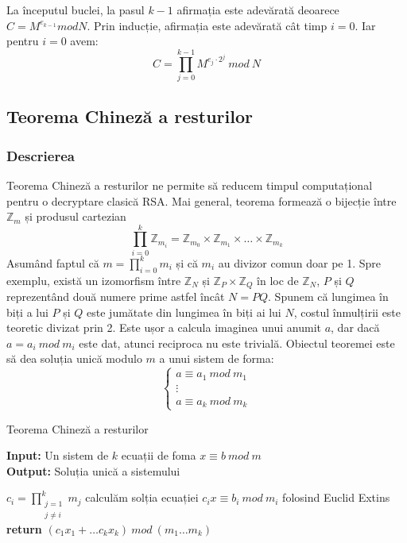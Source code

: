 \documentclass[12]{report}
\begin{document}
      
      La începutul buclei, la pasul $ k-1 $ afirmația este adevărată deoarece $ C = M^{e_{k-1}} mod N$. Prin inducție, afirmația este adevărată cât timp $ i=0$. Iar pentru $i=0$ avem: \\
      $$ C= \prod_{j=0}^{k-1} M^{e_j \cdot   2^j}  \ mod \ N $$
      
     \subsection{Teorema Chineză a resturilor}
      \subsubsection{Descrierea}
      Teorema Chineză a resturilor ne permite să reducem timpul computațional pentru o decryptare clasică RSA. Mai general, teorema formează o bijecție între $ \mathbb{Z}_m $ și produsul cartezian \\
      $$ \prod_{i=0}^{k} \mathbb{Z}_{m_i} = \mathbb{Z}_{m_0} \times \mathbb{Z}_{m_1} \times \dots \times  \mathbb{Z}_{m_k}$$
      Asumând faptul că $ m = \prod_{i=0}^{k} m_i $ și că $ m_i $ au divizor comun doar pe 1. Spre exemplu, există un izomorfism între $ \mathbb{Z}_N$ și $\mathbb{Z}_P \times \mathbb{Z}_Q  $ în loc de $ \mathbb{Z}_N $, $ P $ și $Q$ reprezentând două numere prime astfel încât $ N=PQ$. Spunem că lungimea în biți a lui $P$ și $Q$ este jumătate din lungimea în biți ai lui $N$, costul înmulțirii este teoretic divizat prin 2. Este ușor a calcula imaginea unui anumit $a$, dar dacă $ a= a_i \ mod \ m_i $ este dat, atunci reciproca nu este trivială. Obiectul teoremei este să dea soluția unică modulo $m$ a unui sistem de forma: \\
    \[
\left\{ 
\begin{array}{c}
a \equiv a_1 \ mod \ m_1 \\ 
 \vdots  \\ 
a \equiv a_k \ mod \ m_k
\end{array}
\right. 
\]

		  \begin{algorithm}[H]
		   \caption{Teorema Chineză a resturilor}
		   \textbf{Input:} Un sistem de $k$ ecuații de foma $x \equiv b \ mod \ m$ \\
		   \textbf{Output:} Soluția unică a sistemului
		   \begin{algorithmic}
		   	\State $c_i = \prod_{\substack{j=1 \\ j \neq i }}^{k} m_j$
		   	\EndFor
		   	\State calculăm solția ecuației $ c_ix \equiv b_i \ mod \ m_i $ folosind Euclid Extins 
		   	\State \textbf{return} $(c_1x_1 + \dots c_kx_k) \ mod \ (m_1 \dots m_k) $ 
		   \end{algorithmic}
		   \end{algorithm}
		   
\end{document}
